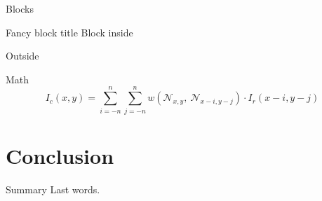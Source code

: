 \documentclass[compress]{beamer}
\begin{document}
\begin{frame}{Blocks}
  \begin{block}{Fancy block title}
    Block inside
  \end{block}

  Outside
\end{frame}

\begin{frame}{Math}
  \begin{equation*}
    I_c(x,y) = \sum_{i=-n}^n\sum_{j=-n}^n w\left(
      \mathcal{N}_{x,y},\ \mathcal{N}_{x-i, y-j}\right)
      \cdot
      I_r(x-i,y-j)
  \end{equation*}
\end{frame}


\section{Conclusion}

\begin{frame}{Summary}
  Last words.
\end{frame}
\end{document}
